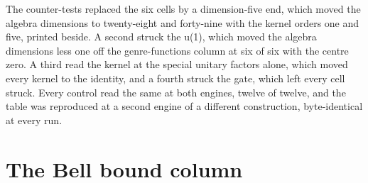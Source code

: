 \begin{chproof}[instrument]
The counter-tests replaced the six cells by a dimension-five end, which moved the algebra dimensions to twenty-eight and forty-nine with the kernel orders one and five, printed beside. A second struck the u(1), which moved the algebra dimensions less one off the genre-functions column at six of six with the centre zero. A third read the kernel at the special unitary factors alone, which moved every kernel to the identity, and a fourth struck the gate, which left every cell struck. Every control read the same at both engines, twelve of twelve, and the table was reproduced at a second engine of a different construction, byte-identical at every run.
\end{chproof}

\section{The Bell bound column}\label{mod:IV-14-bell-bound-column}
